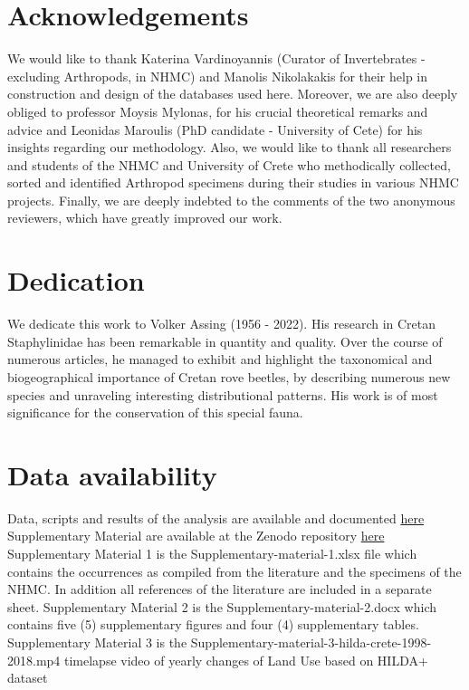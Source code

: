 \section*{Acknowledgements}
We would like to thank Katerina Vardinoyannis (Curator of Invertebrates - excluding Arthropods, in NHMC) and
Manolis Nikolakakis for their help in construction and design of the databases
used here. Moreover, we are also deeply obliged to professor Moysis Mylonas,
for his crucial theoretical remarks and advice and Leonidas Maroulis (PhD candidate - University of Cete)
for his insights regarding our methodology. Also, we would like to thank all
researchers and students of the NHMC and University of Crete who methodically
collected, sorted and identified Arthropod specimens during their studies in
various NHMC projects. Finally, we are deeply indebted to the comments of the
two anonymous reviewers, which have greatly improved our work.

\section*{Dedication}
We dedicate this work to Volker Assing (1956 - 2022). His research in Cretan
Staphylinidae has been remarkable in quantity and quality. Over the course of
numerous articles, he managed to exhibit and highlight the taxonomical and
biogeographical importance of Cretan rove beetles, by describing numerous new
species and unraveling interesting distributional patterns. His work is of most
significance for the conservation of this special fauna.

\section*{Data availability}
Data, scripts and results of the analysis are available and documented \href{https://github.com/savvas-paragkamian/arthropods_assessment_crete}{here}
Supplementary Material are available at the Zenodo repository \href{https://doi.org/10.5281/zenodo.10635645}{here}
Supplementary Material 1 is the Supplementary-material-1.xlsx file which
contains the occurrences as compiled from the literature and the specimens of the
NHMC. In addition all references of the literature are included in a separate sheet.
Supplementary Material 2 is the Supplementary-material-2.docx which
contains five (5) supplementary figures and four (4) supplementary tables.
Supplementary Material 3 is the
Supplementary-material-3-hilda-crete-1998-2018.mp4 timelapse video of yearly
changes of Land Use based on HILDA+ dataset 

